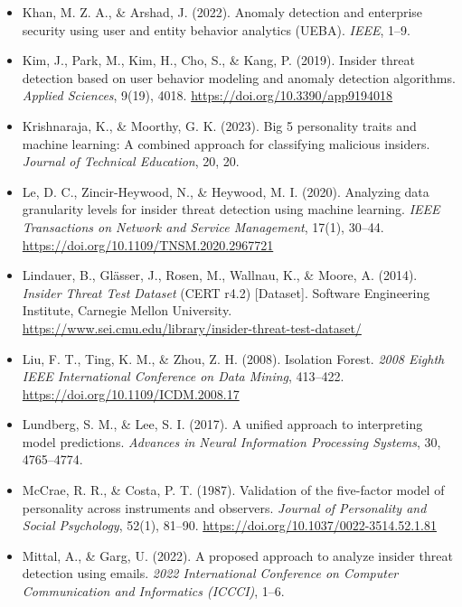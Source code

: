 \documentclass[IB]{TFUOC}%
\begin{document}
\begin{itemize}
    \item Khan, M. Z. A., \& Arshad, J. (2022). Anomaly detection and 
    enterprise security using user and entity behavior analytics (UEBA). 
    \textit{IEEE}, 1--9.

    \item Kim, J., Park, M., Kim, H., Cho, S., \& Kang, P. (2019). Insider 
    threat detection based on user behavior modeling and anomaly detection 
    algorithms. \textit{Applied Sciences}, 9(19), 4018. 
    \url{https://doi.org/10.3390/app9194018}

    \item Krishnaraja, K., \& Moorthy, G. K. (2023). Big 5 personality traits 
    and machine learning: A combined approach for classifying malicious 
    insiders. \textit{Journal of Technical Education}, 20, 20.

    \item Le, D. C., Zincir-Heywood, N., \& Heywood, M. I. (2020). Analyzing 
    data granularity levels for insider threat detection using machine learning. 
    \textit{IEEE Transactions on Network and Service Management}, 17(1), 
    30--44. \url{https://doi.org/10.1109/TNSM.2020.2967721}

    \item Lindauer, B., Glässer, J., Rosen, M., Wallnau, K., \& Moore, A. 
    (2014). \textit{Insider Threat Test Dataset} (CERT r4.2) [Dataset]. 
    Software Engineering Institute, Carnegie Mellon University. 
    \url{https://www.sei.cmu.edu/library/insider-threat-test-dataset/}

    \item Liu, F. T., Ting, K. M., \& Zhou, Z. H. (2008). Isolation Forest. 
    \textit{2008 Eighth IEEE International Conference on Data Mining}, 
    413--422. \url{https://doi.org/10.1109/ICDM.2008.17}

    \item Lundberg, S. M., \& Lee, S. I. (2017). A unified approach to 
    interpreting model predictions. \textit{Advances in Neural Information 
    Processing Systems}, 30, 4765--4774.

    \item McCrae, R. R., \& Costa, P. T. (1987). Validation of the five-factor 
    model of personality across instruments and observers. \textit{Journal of 
    Personality and Social Psychology}, 52(1), 81--90. 
    \url{https://doi.org/10.1037/0022-3514.52.1.81}

    \item Mittal, A., \& Garg, U. (2022). A proposed approach to analyze 
    insider threat detection using emails. \textit{2022 International 
    Conference on Computer Communication and Informatics (ICCCI)}, 1--6.


\end{itemize}
\end{document}
